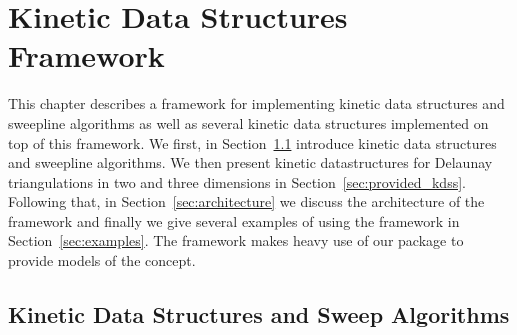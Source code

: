 \usepackage{url}

\chapter{Kinetic Data Structures Framework}
\label{chapter-kds}
\minitoc






\def\note#1{$\langle\langle${\bf #1}$\rangle\rangle$}





This chapter describes a framework for implementing kinetic data
structures and sweepline algorithms as well as several kinetic data
structures implemented on top of this framework. We first, in
Section~\ref{sec:kds_intro} introduce kinetic data structures and
sweepline algorithms. We then present kinetic datastructures for
Delaunay triangulations in two and three dimensions in
Section~\ref{sec:provided_kdss}. Following that, in
Section~\ref{sec:architecture} we discuss the architecture of the
framework and finally we give several examples of using the framework
in Section~\ref{sec:examples}. The framework makes heavy use of our
 package to provide models of the 
concept.

\section{Kinetic Data Structures and Sweep Algorithms}
\label{sec:kds_intro}


